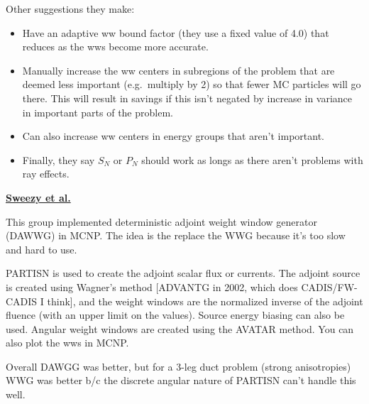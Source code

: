 \documentclass[12pt,twoside]{article}
\begin{document}
Other suggestions they make:
\begin{itemize}
  \item Have an adaptive ww bound factor (they use a fixed value of 4.0) that reduces as the wws become more accurate.
  \item Manually increase the ww centers in subregions of the problem that are deemed less important (e.g.\ multiply by 2) so that fewer MC particles will go there. This will result in savings if this isn't negated by increase in variance in important parts of the problem.
  \item Can also increase ww centers in energy groups that aren't important.
  \item Finally, they say $S_N$ or $P_N$ should work as longs as there aren't problems with ray effects. 
\end{itemize}


\vspace*{3em}
\begin{center}
\underline{\textbf{Sweezy et al.}} \cite{Sweezy2005}
\end{center}

This group implemented deterministic adjoint weight window generator (DAWWG) in MCNP. The idea is the replace the WWG because it's too slow and hard to use.

PARTISN is used to create the adjoint scalar flux or currents. The adjoint source is created using Wagner's method [ADVANTG in 2002, which does CADIS/FW-CADIS I think], and the weight windows are the normalized inverse of the adjoint fluence (with an upper limit on the values). Source energy biasing can also be used. Angular weight windows are created using the AVATAR method. You can also plot the wws in MCNP. 

Overall DAWGG was better, but for a 3-leg duct problem (strong anisotropies) WWG was better b/c the discrete angular nature of PARTISN can't handle this well. 
\end{document}
